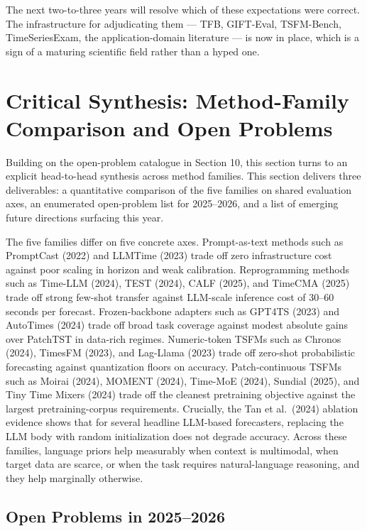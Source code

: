 \documentclass{article}
\begin{document}
The next two-to-three years will resolve which of these expectations were correct. The infrastructure for adjudicating them --- TFB, GIFT-Eval, TSFM-Bench, TimeSeriesExam, the application-domain literature --- is now in place, which is a sign of a maturing scientific field rather than a hyped one.

\section{Critical Synthesis: Method-Family Comparison and Open Problems}\label{critical-synthesis-method-family-comparison-and-open-problems}

Building on the open-problem catalogue in Section 10, this section turns to an explicit head-to-head synthesis across method families. This section delivers three deliverables: a quantitative comparison of the five families on shared evaluation axes, an enumerated open-problem list for 2025--2026, and a list of emerging future directions surfacing this year.

The five families differ on five concrete axes. Prompt-as-text methods such as PromptCast (2022) and LLMTime (2023) trade off zero infrastructure cost against poor scaling in horizon and weak calibration. Reprogramming methods such as Time-LLM (2024), TEST (2024), CALF (2025), and TimeCMA (2025) trade off strong few-shot transfer against LLM-scale inference cost of 30--60 seconds per forecast. Frozen-backbone adapters such as GPT4TS (2023) and AutoTimes (2024) trade off broad task coverage against modest absolute gains over PatchTST in data-rich regimes. Numeric-token TSFMs such as Chronos (2024), TimesFM (2023), and Lag-Llama (2023) trade off zero-shot probabilistic forecasting against quantization floors on accuracy. Patch-continuous TSFMs such as Moirai (2024), MOMENT (2024), Time-MoE (2024), Sundial (2025), and Tiny Time Mixers (2024) trade off the cleanest pretraining objective against the largest pretraining-corpus requirements. Crucially, the Tan et al.~(2024) ablation evidence shows that for several headline LLM-based forecasters, replacing the LLM body with random initialization does not degrade accuracy. Across these families, language priors help measurably when context is multimodal, when target data are scarce, or when the task requires natural-language reasoning, and they help marginally otherwise.

\subsection{Open Problems in 2025--2026}\label{open-problems-in-20252026}
\end{document}
